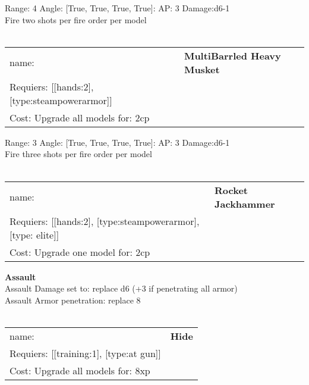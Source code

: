Range: 4  Angle: [True, True, True, True]: AP: 3 Damage:d6-1 \\
Fire two shots per fire order per model\\ 








\ \\
\begin{tabular}{ll}
name: & {\bf MultiBarrled Heavy Musket } \\
Requiers: [[hands:2], [type:steampowerarmor]] \\
Cost: Upgrade all models for: 2cp \\
\end{tabular}



Range: 3  Angle: [True, True, True, True]: AP: 3 Damage:d6-1 \\
Fire three shots per fire order per model\\ 








\ \\
\begin{tabular}{ll}
name: & {\bf Rocket Jackhammer } \\
Requiers: [[hands:2], [type:steampowerarmor], [type: elite]] \\
Cost: Upgrade one model for: 2cp \\
\end{tabular}





{\bf Assault} \ \\
Assault Damage set to: replace d6 (+3 if penetrating all armor)
\\ 
Assault Armor penetration: replace 8 
\\ 




\ \\
\begin{tabular}{ll}
name: & {\bf Hide } \\
Requiers: [[training:1], [type:at gun]] \\
Cost: Upgrade all models for: 8xp \\
\end{tabular}

